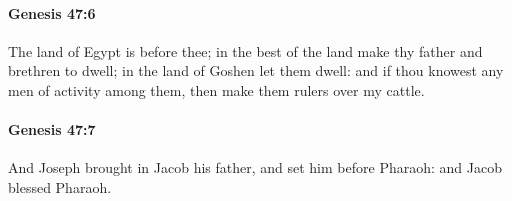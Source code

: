 		\paragraph{Genesis 47:6} %
			\label{GENESIS-47-6}

			The land of Egypt is before thee; in the best of the land make thy father and brethren to dwell; in the land of Goshen let them dwell: and if thou knowest any men of activity among them, then make them rulers over my cattle.


		\paragraph{Genesis 47:7} %
			\label{GENESIS-47-7}

			And Joseph brought in Jacob his father, and set him before Pharaoh: and Jacob blessed Pharaoh.



